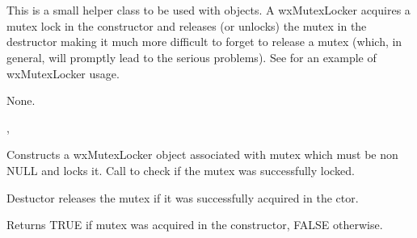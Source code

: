 \section{}\label{wxmutexlocker}

This is a small helper class to be used with  
objects. A wxMutexLocker acquires a mutex lock in the constructor and releases
(or unlocks) the mutex in the destructor making it much more difficult to
forget to release a mutex (which, in general, will promptly lead to the serious
problems). See  for an example of wxMutexLocker
usage.


None.


, 


\label{wxmutexlockerctor}


Constructs a wxMutexLocker object associated with mutex which must be non NULL
and locks it. Call  to check if the mutex was
successfully locked.

\label{wxmutexlockerdtor}


Destuctor releases the mutex if it was successfully acquired in the ctor.

\label{wxmutexlockerisok}


Returns TRUE if mutex was acquired in the constructor, FALSE otherwise.

